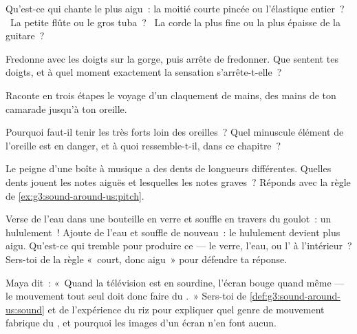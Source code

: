 \begin{exercise}[$\star$]\label{exo:g3:sound-around-us:5}
Qu'est-ce qui chante le plus aigu~: la moitié courte pincée ou
l'élastique entier~? \ La petite flûte ou le gros tuba~? \ La corde la
plus fine ou la plus épaisse de la guitare~?
\end{exercise}

\begin{exercise}[$\star$]\label{exo:g3:sound-around-us:6}
Fredonne avec les doigts sur la gorge, puis arrête de fredonner. Que
sentent tes doigts, et à quel moment exactement la sensation
s'arrête-t-elle~?
\end{exercise}

\begin{exercise}[$\star$]\label{exo:g3:sound-around-us:7}
Raconte en trois étapes le voyage d'un claquement de mains, des mains
de ton camarade jusqu'à ton oreille.
\end{exercise}

\begin{exercise}[$\star$]\label{exo:g3:sound-around-us:8}
Pourquoi faut-il tenir les  très forts loin des oreilles~? Quel
minuscule élément de l'oreille est en danger, et à quoi
ressemble-t-il, dans ce chapitre~?
\end{exercise}

\begin{exercise}[$\star$]\label{exo:g3:sound-around-us:9}
Le peigne d'une boîte à musique a des dents de longueurs différentes.
Quelles dents jouent les notes aiguës et lesquelles les notes
graves~? Réponds avec la règle de \cref{ex:g3:sound-around-us:pitch}.
\end{exercise}

\begin{exercise}[$\star\star$]\label{exo:g3:sound-around-us:10}
Verse de l'eau dans une bouteille en verre et souffle en travers du
goulot~: un hululement~! Ajoute de l'eau et souffle de nouveau~: le
hululement devient plus aigu. Qu'est-ce qui tremble pour produire ce
 --- le verre, l'eau, ou l' à l'intérieur~? Sers-toi de la
règle «~court, donc aigu~» pour défendre ta réponse.
\end{exercise}

\begin{exercise}[$\star\star$]\label{exo:g3:sound-around-us:11}
Maya dit~: «~Quand la télévision est en sourdine, l'écran bouge
quand même --- le mouvement tout seul doit donc faire du .~»
Sers-toi de \cref{def:g3:sound-around-us:sound} et de l'expérience du
riz pour expliquer quel genre de mouvement fabrique du , et
pourquoi les images d'un écran n'en font aucun.
\end{exercise}
